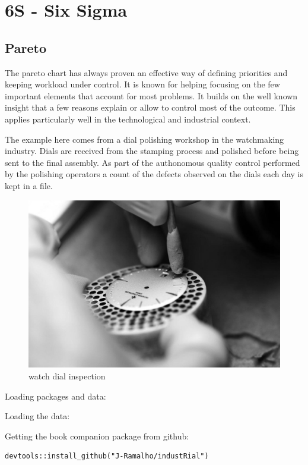 \documentclass[
]{book}
\begin{document}
\hypertarget{s---six-sigma}{%
\chapter{6S - Six Sigma}\label{s---six-sigma}}

\hypertarget{pareto}{%
\section{Pareto}\label{pareto}}

The pareto chart has always proven an effective way of defining priorities and keeping workload under control. It is known for helping focusing on the few important elements that account for most problems. It builds on the well known insight that a few reasons explain or allow to control most of the outcome. This applies particularly well in the technological and industrial context.

The example here comes from a dial polishing workshop in the watchmaking industry. Dials are received from the stamping process and polished before being sent to the final assembly. As part of the authonomous quality control performed by the polishing operators a count of the defects observed on the dials each day is kept in a file.

\begin{figure}

{\centering \includegraphics[width=0.6\linewidth]{img/assemblage_cadran_bw} 

}

\caption{watch dial inspection}\label{fig:unnamed-chunk-2}
\end{figure}

Loading packages and data:

Loading the data:

Getting the book companion package from github:

\begin{verbatim}
devtools::install_github("J-Ramalho/industRial")
\end{verbatim}
\end{document}
